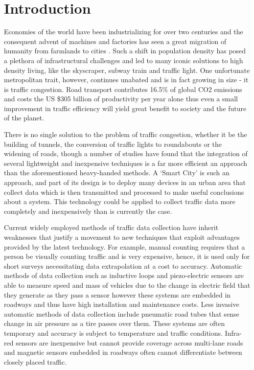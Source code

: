 \chapter{Introduction}
\parskip 0.2in
Economies of the world have been industrializing for over two centuries and the consequent advent of machines and factories has seen a great migration of humanity from farmlands to cities \cite{industrialization} . Such a shift in population density has posed a plethora of infrastructural challenges and led to many iconic solutions to high density living, like the skyscraper, subway train and traffic light. One unfortunate metropolitan trait, however, continues unabated and is in fact growing in size \cite{trafficworse} - it is traffic congestion. Road transport contributes 16.5\% of global CO2 emissions \cite{emissions} and costs the US \$305 billion of productivity per year alone \cite{ecotoll}\cite{cost} thus even a small improvement in traffic efficiency will yield great benefit to society and the future of the planet.

There is no single solution to the problem of traffic congestion, whether it be the building of tunnels, the conversion of traffic lights to roundabouts or the widening of roads, though a number of studies \cite{mixedSolution}\cite{smartsolution}\cite{smartsolution2}\cite{smartsolution3} have found that the integration of several lightweight and inexpensive techniques is a far more efficient an approach than the aforementioned heavy-handed methods. A ‘Smart City’ is such an approach, and part of its design is to deploy many devices in an urban area that collect data \cite{iot} which is then transmitted and processed to make useful conclusions about a system. This technology could be applied to collect traffic data more completely and inexpensively than is currently the case.
 
Current widely employed methods of traffic data collection \cite{methodsofcollection} have inherit weaknesses that justify a movement to new techniques that exploit advantages provided by the latest technology. For example, manual counting requires that a person be visually counting traffic and is very expensive, hence, it is used only for short surveys necessitating data extrapolation at a cost to accuracy. Automatic methods of data collection such as inductive loops and piezo-electric sensors are able to measure speed and mass of vehicles due to the change in electric field that they generate as they pass a sensor however these systems are embedded in roadways and thus have high installation and maintenance costs. Less invasive automatic methods of data collection include pneumatic road tubes that sense change in air pressure as a tire passes over them. These systems are often temporary and accuracy is subject to temperature and traffic conditions. Infra-red sensors are inexpensive but cannot provide coverage across multi-lane roads and magnetic sensors embedded in roadways often cannot differentiate between closely placed traffic. 

